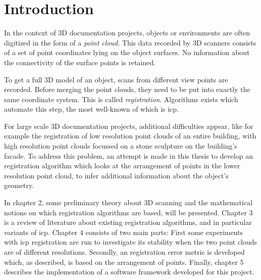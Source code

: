 \chapter{Introduction}
In the context of 3D documentation projects, objects or environments are often digitized in the form of a \emph{point cloud}. This data recorded by 3D scanners consists of a set of point coordinates lying on the object surfaces. No information about the connectivity of the surface points is retained.

To get a full 3D model of an object, scans from different view points are recorded. Before merging the point clouds, they need to be put into exactly the same coordinate system. This is called \emph{registration}. Algorithms exists which automate this step, the most well-known of which is \gls{icp}.

For large scale 3D documentation projects, additional difficulties appear, like for example the registration of low resolution point clouds of an entire building, with high resolution point clouds focussed on a stone sculpture on the building's facade. To address this problem, an attempt is made in this thesis to develop an registration algorithm which looks at the arrangement of points in the lower resolution point cloud, to infer additional information about the object's geometry.

In chapter 2, some preliminary theory about 3D scanning and the mathematical notions on which registration algorithms are based, will be presented. Chapter 3 is a review of literature about existing registration algorithms, and in particular variants of \gls{icp}. Chapter 4 consists of two main parts: First some experiments with \gls{icp} registration are run to investigate its stability when the two point clouds are of different resolutions. Secondly, an registration error metric is developed which, as described, is based on the arrangement of points. Finally, chapter 5 describes the \cpp{} implementation of a software framework developed for this project.
